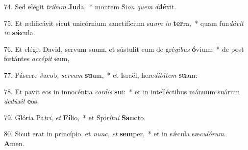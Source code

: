 74. Sed elégit \textit{tri}\textit{bum} \textbf{Ju}da,~*  montem Si\textit{on} \textit{quem} \textit{di}\textbf{lé}xit.\

75. Et ædificávit sicut unicórnium sanctifícium su\textit{um} \textit{in} \textbf{ter}ra,~*  quam fun\textit{dá}\textit{vit} \textit{in} \textbf{sǽ}cula.\

76. Et elégit David, servum suum, et sústulit eum de gré\textit{gi}\textit{bus} \textbf{ó}vium:~*  de post fœtántes \textit{ac}\textit{cé}\textit{pit} \textbf{e}um,\

77. Páscere Jacob, \textit{ser}\textit{vum} \textbf{su}um,~*  et Israël, here\textit{di}\textit{tá}\textit{tem} \textbf{su}am:\

78. Et pavit eos in innocéntia \textit{cor}\textit{dis} \textbf{su}i:~*  et in intelléctibus mánuum suárum \textit{de}\textit{dú}\textit{xit} \textbf{e}os.\

79. Glória Pa\textit{tri}, \textit{et} \textbf{Fí}lio,~*  et Spi\textit{rí}\textit{tu}\textit{i} \textbf{Sanc}to.\

80. Sicut erat in princípio, et \textit{nunc}, \textit{et} \textbf{sem}per,~*  et in sǽcula sæ\textit{cu}\textit{ló}\textit{rum}. \textbf{A}men.\

